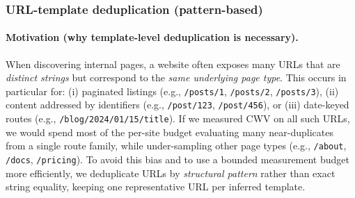 \subsubsection{URL-template deduplication (pattern-based)}
\label{app:url-template-dedup}

\paragraph{Motivation (why template-level deduplication is necessary).}
When discovering internal pages, a website often exposes many URLs that are \emph{distinct strings} but correspond to the \emph{same underlying page type}. This occurs in particular for:
(i) paginated listings (e.g., \texttt{/posts/1}, \texttt{/posts/2}, \texttt{/posts/3}),
(ii) content addressed by identifiers (e.g., \texttt{/post/123}, \texttt{/post/456}),
or (iii) date-keyed routes (e.g., \texttt{/blog/2024/01/15/title}).
If we measured CWV on all such URLs, we would spend most of the per-site budget evaluating many near-duplicates from a single route family, while under-sampling other page types (e.g., \texttt{/about}, \texttt{/docs}, \texttt{/pricing}). To avoid this bias and to use a bounded measurement budget more efficiently, we deduplicate URLs by \emph{structural pattern} rather than exact string equality, keeping one representative URL per inferred template.

